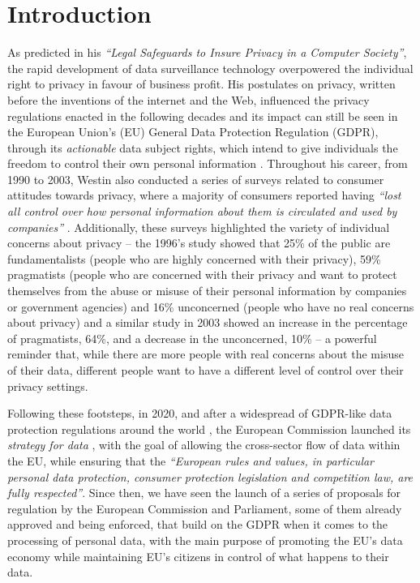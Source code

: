 \chapter{Introduction}
\label{chap:intro}


As \cite{westin_legal_1967} predicted in his \textit{``Legal Safeguards to Insure Privacy in a Computer Society''}, the rapid development of data surveillance technology overpowered the individual right to privacy in favour of business profit.
His postulates on privacy, written before the inventions of the internet and the Web, influenced the privacy regulations enacted in the following decades and its impact can still be seen in the European Union's (EU) General Data Protection Regulation (GDPR), through its \textit{actionable} data subject rights, which intend to give individuals the freedom to control their own personal information \citep{westin_privacy_1967}.
Throughout his career, from 1990 to 2003, Westin also conducted a series of surveys related to consumer attitudes towards privacy, where a majority of consumers reported having \textit{``lost all control over how personal information about them is circulated and used by companies''} \citep{kumaraguru_privacy_2005}.
Additionally, these surveys highlighted the variety of individual concerns about privacy -- the 1996's study \citep{westin_equifax-harris_1996} showed that 25\% of the public are fundamentalists (people who are highly concerned with their privacy), 59\% pragmatists (people who are concerned with their privacy and want to protect themselves from the abuse or misuse of their personal information by companies or government agencies) and 16\% unconcerned (people who have no real concerns about privacy) and a similar study in 2003 \citep{taylor_most_2003} showed an increase in the percentage of pragmatists, 64\%, and a decrease in the unconcerned, 10\% -- a powerful reminder that, while there are more people with real concerns about the misuse of their data, different people want to have a different level of control over their privacy settings.

Following these footsteps, in 2020, and after a widespread of GDPR-like data protection regulations around the world \citep{bradford_brussels_2019}, the European Commission launched its \textit{strategy for data} \citep{european_commission_communication_2020}, with the goal of allowing the cross-sector flow of data within the EU, while ensuring that the \textit{``European rules and values, in particular personal data protection, consumer protection legislation and competition law, are fully respected''}.
Since then, we have seen the launch of a series of proposals for regulation by the European Commission and Parliament, some of them already approved and being enforced, that build on the GDPR when it comes to the processing of personal data, with the main purpose of promoting the EU's data economy while maintaining EU's citizens in control of what happens to their data.

